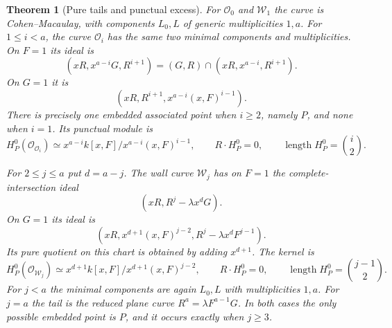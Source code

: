 \documentclass[11pt,reqno]{amsart}
\numberwithin{equation}{section}
\newtheorem{theorem}{Theorem}[section]
\theoremstyle{definition}\newtheorem{definition}[theorem]{Definition}
\theoremstyle{remark}\newtheorem{remark}[theorem]{Remark}
\newcommand{\OO}{\mathcal O}\newcommand{\II}{\mathcal I}
\DeclareMathOperator{\length}{length}
\begin{document}
\begin{theorem}[Pure tails and punctual excess]\label{thm:punctual-v169}
For $\mathcal O_0$ and $\mathcal W_1$ the curve is Cohen--Macaulay,
with components $L_0,L$ of generic multiplicities $1,a$.
For $1\leq i<a$, the curve $\mathcal O_i$ has the same two minimal
components and multiplicities. On $F=1$ its ideal is
\begin{equation}\label{eq:Oi-F-v169}
 (xR,x^{a-i}G,R^{i+1})
    =(G,R)\cap(xR,x^{a-i},R^{i+1}).
\end{equation}
On $G=1$ it is
\begin{equation}\label{eq:Oi-G-v169}
 (xR,R^{i+1},x^{a-i}(x,F)^{i-1}).
\end{equation}
There is precisely one embedded associated point when $i\geq2$, namely
$P$, and none when $i=1$. Its punctual module is
\begin{equation}\label{eq:Oi-torsion-v169}
 H^0_P(\OO_{\mathcal O_i})
   \simeq x^{a-i}k[x,F]\big/x^{a-i}(x,F)^{i-1},\qquad R\cdot H^0_P=0,
 \qquad\length H^0_P=\binom i2.
\end{equation}

For $2\leq j\leq a$ put $d=a-j$. The wall curve $\mathcal W_j$ has
on $F=1$ the complete-intersection ideal
\begin{equation}\label{eq:W-F-v169}
 (xR,R^j-\lambda x^dG).
\end{equation}
On $G=1$ its ideal is
\begin{equation}\label{eq:W-G-v169}
 (xR,x^{d+1}(x,F)^{j-2},R^j-\lambda x^dF^{j-1}).
\end{equation}
Its pure quotient on this chart is obtained by adding $x^{d+1}$.
The kernel is
\begin{equation}\label{eq:W-torsion-v169}
 H^0_P(\OO_{\mathcal W_j})
  \simeq x^{d+1}k[x,F]\big/x^{d+1}(x,F)^{j-2},\qquad R\cdot H^0_P=0,
 \qquad\length H^0_P=\binom{j-1}{2}.
\end{equation}
For $j<a$ the minimal components are again $L_0,L$ with multiplicities
$1,a$. For $j=a$ the tail is the reduced plane curve
$R^a=\lambda F^{a-1}G$. In both cases the only possible embedded point
is $P$, and it occurs exactly when $j\geq3$.
\end{theorem}
\end{document}
